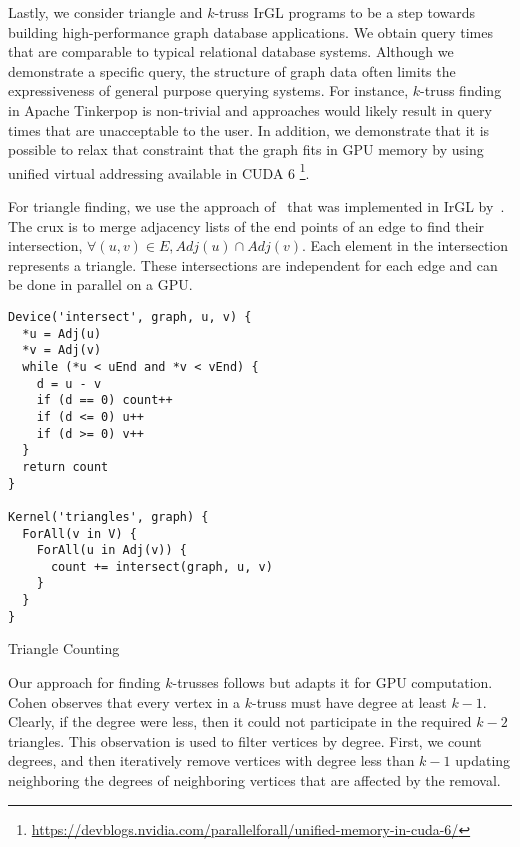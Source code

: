 Lastly, we consider triangle and $k$-truss IrGL programs to be a step towards building high-performance graph database applications.
We obtain query times that are comparable to typical relational database systems.
Although we demonstrate a specific query, the structure of graph data often limits the expressiveness of general purpose querying systems.
For instance, $k$-truss finding in Apache Tinkerpop \cite{rodriguez2015gremlin} is non-trivial and approaches would likely result in query times that are unacceptable to the user.
In addition, we demonstrate that it is possible to relax that constraint that the graph fits in GPU memory by using unified virtual addressing available in CUDA 6 \footnote{\url{https://devblogs.nvidia.com/parallelforall/unified-memory-in-cuda-6/}}.

For triangle finding, we use the approach of~\citet{polak2015gputriangles} that was implemented in IrGL by~\citet{pai2016irgl}.
The crux is to merge adjacency lists of the end points of an edge to find their intersection, $\forall (u,v) \in E, Adj(u) \cap Adj(v)$.
Each element in the intersection represents a triangle.
These intersections are independent for each edge and can be done in parallel on a GPU.

\begin{listing}
\begin{verbatim}
Device('intersect', graph, u, v) {
  *u = Adj(u)
  *v = Adj(v)
  while (*u < uEnd and *v < vEnd) {
    d = u - v
    if (d == 0) count++
    if (d <= 0) u++
    if (d >= 0) v++
  }
  return count
}

Kernel('triangles', graph) {
  ForAll(v in V) {
    ForAll(u in Adj(v)) {
      count += intersect(graph, u, v)
    }
  }
}
\end{verbatim}
\caption{Triangle Counting}
\label{l:tri_irgl}
\end{listing}

Our approach for finding $k$-trusses follows \citet{cohen2008trusses} but adapts it for GPU computation.
Cohen observes that every vertex in a $k$-truss must have degree at least $k-1$.
Clearly, if the degree were less, then it could not participate in the required $k-2$ triangles.
This observation is used to filter vertices by degree.
First, we count degrees, and then iteratively remove vertices with degree less than $k-1$ updating neighboring the degrees of neighboring vertices that are affected by the removal.

